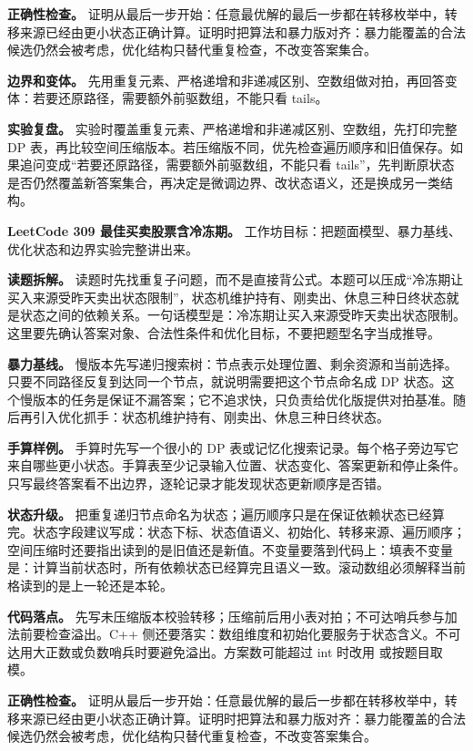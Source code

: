 \textbf{正确性检查。} 证明从最后一步开始：任意最优解的最后一步都在转移枚举中，转移来源已经由更小状态正确计算。证明时把算法和暴力版对齐：暴力能覆盖的合法候选仍然会被考虑，优化结构只替代重复检查，不改变答案集合。

\textbf{边界和变体。} 先用重复元素、严格递增和非递减区别、空数组做对拍，再回答变体：若要还原路径，需要额外前驱数组，不能只看 tails。

\textbf{实验复盘。} 实验时覆盖重复元素、严格递增和非递减区别、空数组，先打印完整 DP 表，再比较空间压缩版本。若压缩版不同，优先检查遍历顺序和旧值保存。如果追问变成“若要还原路径，需要额外前驱数组，不能只看 tails”，先判断原状态是否仍然覆盖新答案集合，再决定是微调边界、改状态语义，还是换成另一类结构。

\noindent\textbf{LeetCode 309 最佳买卖股票含冷冻期。} 工作坊目标：把题面模型、暴力基线、优化状态和边界实验完整讲出来。

\textbf{读题拆解。} 读题时先找重复子问题，而不是直接背公式。本题可以压成“冷冻期让买入来源受昨天卖出状态限制”，状态机维护持有、刚卖出、休息三种日终状态就是状态之间的依赖关系。一句话模型是：冷冻期让买入来源受昨天卖出状态限制。这里要先确认答案对象、合法性条件和优化目标，不要把题型名字当成推导。

\textbf{暴力基线。} 慢版本先写递归搜索树：节点表示处理位置、剩余资源和当前选择。只要不同路径反复到达同一个节点，就说明需要把这个节点命名成 DP 状态。这个慢版本的任务是保证不漏答案；它不追求快，只负责给优化版提供对拍基准。随后再引入优化抓手：状态机维护持有、刚卖出、休息三种日终状态。

\textbf{手算样例。} 手算时先写一个很小的 DP 表或记忆化搜索记录。每个格子旁边写它来自哪些更小状态。手算表至少记录输入位置、状态变化、答案更新和停止条件。只写最终答案看不出边界，逐轮记录才能发现状态更新顺序是否错。

\textbf{状态升级。} 把重复递归节点命名为状态；遍历顺序只是在保证依赖状态已经算完。状态字段建议写成：状态下标、状态值语义、初始化、转移来源、遍历顺序；空间压缩时还要指出读到的是旧值还是新值。不变量要落到代码上：填表不变量是：计算当前状态时，所有依赖状态已经算完且语义一致。滚动数组必须解释当前格读到的是上一轮还是本轮。

\textbf{代码落点。} 先写未压缩版本校验转移；压缩前后用小表对拍；不可达哨兵参与加法前要检查溢出。C++ 侧还要落实：数组维度和初始化要服务于状态含义。不可达用大正数或负数哨兵时要避免溢出。方案数可能超过 int 时改用  或按题目取模。

\textbf{正确性检查。} 证明从最后一步开始：任意最优解的最后一步都在转移枚举中，转移来源已经由更小状态正确计算。证明时把算法和暴力版对齐：暴力能覆盖的合法候选仍然会被考虑，优化结构只替代重复检查，不改变答案集合。

